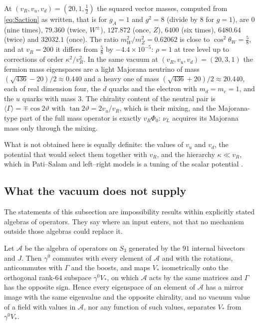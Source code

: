 \begin{example}
\label{ex:EWspectrum}
At $(v_R,v_u,v_d)=(20,1,\tfrac12)$ the squared vector masses, computed from \eqref{eq:Saction} as written, that is for $g_A=1$ and $g^2=8$ (divide
by $8$ for $g=1$), are $0$ (nine times), $79.360$ (twice, $W^\pm$),
$127.872$ (once, $Z$), $6400$ (six times), $6480.64$ (twice) and $32032.1$ (once). The ratio $m_W^2/m_Z^2=0.62062$ is close to $\cos^2\theta_W=\tfrac58$, and at
$v_R=200$ it differs from $\tfrac58$ by $-4.4\times10^{-5}$: $\rho=1$ at tree level up to corrections of order $\kappa^2/v_R^2$. In the same vacuum at
$(v_R,v_u,v_d)=(20,3,1)$ the fermion mass eigenspaces are a light Majorana neutrino of mass $(\sqrt{436}-20)/2\approx0.440$ and a heavy one of mass
$(\sqrt{436}+20)/2\approx20.440$, each of real dimension four, the $d$ quarks and the electron with $m_d=m_e=1$, and the $u$ quarks with mass $3$. The
chirality content of the neutral pair is $\langle\Gamma\rangle=\mp\cos2\vartheta$ with $\tan2\vartheta=2v_u/v_R$, which is their mixing, and the Majorana-type part of the full
mass operator is exactly $v_R\Phi_0$: $\nu_L$ acquires its Majorana mass only through the mixing.
\end{example}

What is not obtained here is equally definite: the values of $v_u$ and $v_d$, the potential that would select them together with $v_R$, and the
hierarchy $\kappa\ll v_R$, which in Pati--Salam and left--right models is a tuning of the scalar potential \cite{Gildener76}.

\subsection{What the vacuum does not supply}

The statements of this subsection are impossibility results within explicitly stated algebras of operators. They say where an input enters, not that no
mechanism outside those algebras could replace it.

\begin{proposition}
\label{prop:mirror}
Let $\mathcal A$ be the algebra of operators on $S_3$ generated by the $91$ internal bivectors and $J$. Then $\gamma^0$ commutes with every element of $\mathcal A$ and
with the rotations, anticommutes with $\Gamma$ and the boosts, and maps $V_*$ isometrically onto the orthogonal rank-$64$ subspace $\gamma^0V_*$, on which $\mathcal A$
acts by the same matrices and $\Gamma$ has the opposite sign. Hence every eigenspace of an element of $\mathcal A$ has a mirror image with the same eigenvalue and the
opposite chirality, and no vacuum value of a field with values in $\mathcal A$, nor any function of such values, separates $V_*$ from $\gamma^0V_*$.
\end{proposition}

